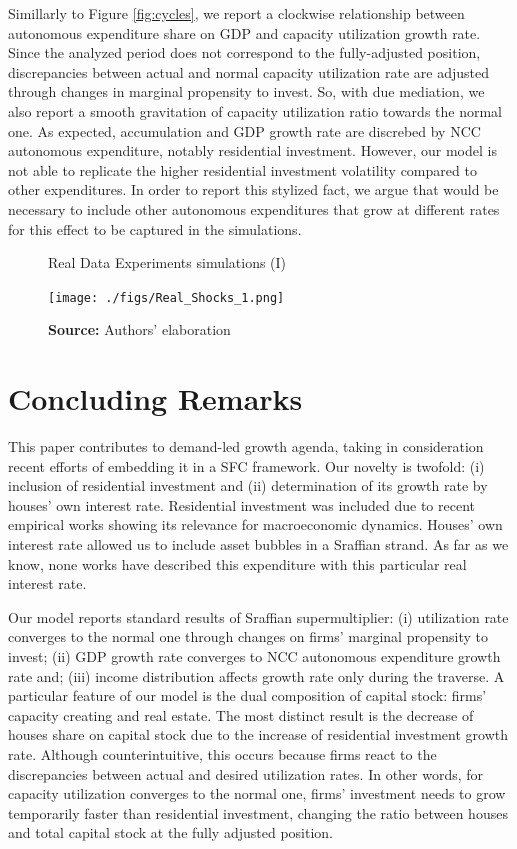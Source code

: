 \documentclass[11pt]{article}
\begin{document}
Simillarly to Figure \ref{fig:cycles}, we report a clockwise relationship between autonomous expenditure share on GDP and capacity utilization growth rate.
Since the analyzed period does not correspond to the fully-adjusted position, discrepancies between actual and normal capacity utilization rate are adjusted through changes in marginal propensity to invest.
So, with due mediation, we also report a smooth gravitation of capacity utilization ratio towards the normal one.
As expected, accumulation and GDP growth rate are discrebed by NCC autonomous expenditure, notably residential investment. 
However, our model is not able to replicate the higher residential investment volatility compared to other expenditures.
In order to report this stylized fact, we argue that would be necessary to include other autonomous expenditures that grow at different rates for this effect to be captured in the simulations.




\begin{figure}[htb]
	\centering
	\caption{Real Data Experiments simulations (I)}
	\label{fig:Realresults_1}
	\texttt{[image: ./figs/Real\_Shocks\_1.png]}
	\caption*{\textbf{Source:} Authors' elaboration}
\end{figure}



\section{Concluding Remarks}
\label{sec:org1d0677c}
\label{sec:Conclusion}
This paper contributes to demand-led growth agenda, taking in consideration recent efforts of embedding it in a SFC framework.
Our novelty is twofold: (i) inclusion of residential investment and (ii) determination of its growth rate by houses' own interest rate.
Residential investment was included due to recent empirical works showing its relevance for macroeconomic dynamics.
Houses' own interest rate allowed us to include asset bubbles in a Sraffian strand.
As far as we know, none works have described this expenditure with this particular real interest rate.

Our model reports standard results of Sraffian supermultiplier:
    (i) utilization rate converges to the normal one through changes on firms' marginal propensity to invest;
    (ii) GDP growth rate converges to NCC autonomous expenditure growth rate and;
    (iii) income distribution affects growth rate only during the traverse.
A particular feature of our model is the dual composition of capital stock: firms' capacity creating and real estate.
The most distinct result is the decrease of houses share on capital stock due to the increase of residential investment growth rate.
Although counterintuitive, this occurs because firms react to the discrepancies between actual and desired utilization rates.
In other words, for capacity utilization converges to the normal one,  firms' investment needs to grow temporarily faster than residential investment, changing the ratio between houses and total capital stock at the fully adjusted position.
\end{document}
